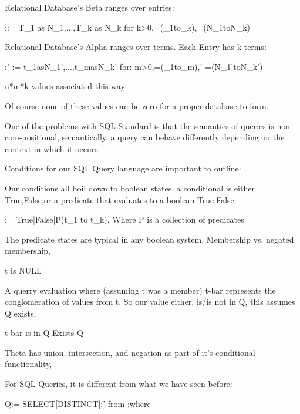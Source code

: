 \documentclass[12pt]{article}
\begin{document}
\item Relational Database's Beta ranges over entries:
\item \tau :\beta := T_{1} as N_{1},...,T_{k} as N_{k}\; for \;k>0,\tau=(\tau _{1}to\tau_{k}),\beta =(N_{1}toN_{k})

\item Relational Database's Alpha ranges over terms. Each Entry has k terms:
\item \alpha :{\beta}' := t_{1}as{N_{1}}',...,t_{m}as{N_{k}}' \; for: \;m>0,\alpha=(\tau _{1}to\tau_{m}),{\beta}' =({N_{1}}'to{N_{k}}')

\item n*m*k values associated this way
\item Of course none of these values can be zero for a proper database to form.

\item One of the problems with SQL Standard is that the semantics of queries is non com-positional, semantically, a query can behave differently depending on the context in which it occurs.

\item Conditions for our SQL Query language are important to outline:
\item Our conditions all boil down to boolean states, a conditional is either True,False,or a predicate that evaluates to a boolean True,False.
\item \theta := True|False|P(t_{1} to t_{k}), \; Where \; P \; is \; a \; collection \; of \; predicates

\item The predicate states are typical in any boolean system. Membership vs. negated membership, 
\item \mid t \; is \; [NOT]\; NULL

\item A querry evaluation where (assuming t was a member) t-bar represents the conglomeration of values from t. So our value either, is/is not in Q, this assumes Q exists,
\item \mid t-bar \; is \; [NOT] \; in \; Q \mid Exists \; Q

\item Theta has union, intersection, and negation as part of it's conditional functionality,
\item \mid \theta [AND][OR]\theta

\item \mid [NOT]\theta

\item For SQL Queries, it is different from what we have seen before:
\item Q:= SELECT[DISTINCT]\alpha :{\beta}' \;from\; \tau :\beta \;where\; \Theta
\end{document}

